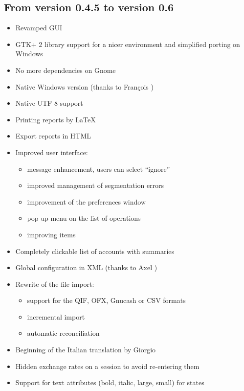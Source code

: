 \subsection{From version 0.4.5 to version 0.6}

\begin{itemize}
	\item Revamped GUI
	\item \gls{GTK}+ 2 library support for a nicer environment and simplified porting on Windows
	\item No more dependencies on \gls{Gnome}
	\item Native Windows version (thanks to François )
	\item Native \gls{UTF-8} support 
	\item Printing reports by \gls{LaTeX}
	\item Export reports in \gls{HTML}
	\item Improved user interface:
		\begin{itemize}
			\item[\textopenbullet] message enhancement, users can select ``ignore''
			\item[\textopenbullet] improved management of segmentation errors
			\item[\textopenbullet] improvement of the preferences window
			\item[\textopenbullet] pop-up menu on the list of operations
			\item[\textopenbullet] improving items
		\end{itemize}
	\item Completely clickable list of accounts with summaries
	\item Global configuration in \gls{XML} (thanks to Axel )
	\item Rewrite of the file import:
		\begin{itemize}
			\item[\textopenbullet] support for the \gls{QIF}, \gls{OFX}, \gls{Gnucash} or \gls{CSV}  formats
			\item[\textopenbullet] incremental import
			\item[\textopenbullet] automatic reconciliation
		\end{itemize}
	\item Beginning of the Italian translation by Giorgio 
	\item Hidden exchange rates on a session to avoid re-entering them
	\item Support for text attributes (bold, italic, large, small) for states

\end{itemize}
